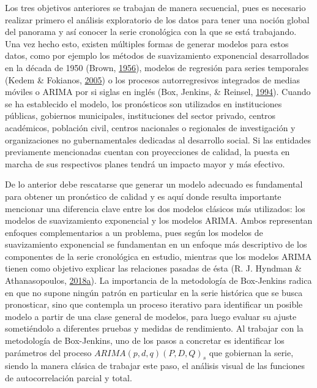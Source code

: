 \documentclass[
]{article}
\begin{document}
Los tres objetivos anteriores se trabajan de manera secuencial, pues es
necesario realizar primero el análisis exploratorio de los datos para
tener una noción global del panorama y así conocer la serie cronológica
con la que se está trabajando. Una vez hecho esto, existen múltiples
formas de generar modelos para estos datos, como por ejemplo los métodos
de suavizamiento exponencial desarrollados en la década de 1950 (Brown,
\protect\hyperlink{ref-brown}{1956}), modelos de regresión para series
temporales (Kedem \& Fokianos, \protect\hyperlink{ref-kedem}{2005}) o
los procesos autorregresivos integrados de medias móviles o ARIMA por si
siglas en inglés (Box, Jenkins, \& Reinsel,
\protect\hyperlink{ref-box-jenkins}{1994}). Cuando se ha establecido el
modelo, los pronósticos son utilizados en instituciones públicas,
gobiernos municipales, instituciones del sector privado, centros
académicos, población civil, centros nacionales o regionales de
investigación y organizaciones no gubernamentales dedicadas al
desarrollo social. Si las entidades previamente mencionadas cuentan con
proyecciones de calidad, la puesta en marcha de sus respectivos planes
tendrá un impacto mayor y más efectivo.

De lo anterior debe rescatarse que generar un modelo adecuado es
fundamental para obtener un pronóstico de calidad y es aquí donde
resulta importante mencionar una diferencia clave entre los dos modelos
clásicos más utilizados: los modelos de suavizamiento exponencial y los
modelos ARIMA. Ambos representan enfoques complementarios a un problema,
pues según los modelos de suavizamiento exponencial se fundamentan en un
enfoque más descriptivo de los componentes de la serie cronológica en
estudio, mientras que los modelos ARIMA tienen como objetivo explicar
las relaciones pasadas de ésta (R. J. Hyndman \& Athanasopoulos,
\protect\hyperlink{ref-hyndman2018forecasting}{2018}\protect\hyperlink{ref-hyndman2018forecasting}{a}).
La importancia de la metodología de Box-Jenkins radica en que no supone
ningún patrón en particular en la serie histórica que se busca
pronosticar, sino que contempla un proceso iterativo para identificar un
posible modelo a partir de una clase general de modelos, para luego
evaluar su ajuste sometiéndolo a diferentes pruebas y medidas de
rendimiento. Al trabajar con la metodología de Box-Jenkins, uno de los
pasos a concretar es identificar los parámetros del proceso
\(ARIMA(p,d,q)(P,D,Q)_s\) que gobiernan la serie, siendo la manera
clásica de trabajar este paso, el análisis visual de las funciones de
autocorrelación parcial y total.
\end{document}
